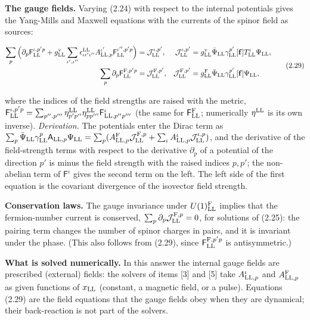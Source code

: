\documentclass[
  10pt,
]{article}
\begin{document}
\textbf{The gauge fields.} Varying (2.24) with respect to the internal
potentials gives the Yang-Mills and Maxwell equations with the currents
of the spinor field as sources:

\[\begin{aligned}
\sum_p\Big(\partial_p\mathsf F^{\iota,p'p}_{\rm LL}+g^{\rm v}_{\rm LL}\sum_{\iota',\iota''}\epsilon^{\rm LL}_{\iota\iota'\iota''}A^{\iota'}_{{\rm LL},p}\mathsf F^{\iota'',p'p}_{\rm LL}\Big)&=\mathcal J^{\iota,p'}_{\rm LL},&\mathcal J^{\iota,p'}_{\rm LL}&=g^{\rm v}_{\rm LL}\bar\Psi_{\rm LL}\gamma^{p'}_{\rm LL}[\mathbf f]T^\iota_{\rm LL}\Psi_{\rm LL},\\
\sum_p\partial_p\mathsf F^{{\rm F},p'p}_{\rm LL}&=\mathcal J^{{\rm F},p'}_{\rm LL},&\mathcal J^{{\rm F},p'}_{\rm LL}&=g^{\rm F}_{\rm LL}\bar\Psi_{\rm LL}\gamma^{p'}_{\rm LL}[\mathbf f]\Psi_{\rm LL},
\end{aligned}\tag{2.29}\]

where the indices of the field strengths are raised with the metric,
\(\mathsf F^{\iota,p'p}_{\rm LL}=\sum_{p'',p'''}\eta^{\rm LL}_{p'p''}\eta^{\rm LL}_{pp'''}\mathsf F^\iota_{{\rm LL},p''p'''}\)
(the same for \(\mathsf F^{\rm F}_{{\rm LL}}\); numerically
\(\eta^{\rm LL}\) is its own inverse). \emph{Derivation.} The potentials
enter the Dirac term as
\(\sum_p\bar\Psi_{\rm LL}\gamma^p_{\rm LL}\mathsf A_{{\rm LL},p}\Psi_{\rm LL}=\sum_p(A^{\rm F}_{{\rm LL},p}\mathcal J^{{\rm F},p}_{\rm LL}+\sum_\iota A^\iota_{{\rm LL},p}\mathcal J^{\iota,p}_{\rm LL})\),
and the derivative of the field-strength terms with respect to the
derivative \(\partial_p\) of a potential of the direction \(p'\) is
minus the field strength with the raised indices \(p,p'\); the
non-abelian term of \(\mathsf F^\iota\) gives the second term on the
left. The left side of the first equation is the covariant divergence of
the isovector field strength.

\textbf{Conservation laws.} The gauge invariance under
\(U(1)^{\rm F}_{\rm LL}\) implies that the fermion-number current is
conserved, \(\sum_p\partial_p\mathcal J^{{\rm F},p}_{\rm LL}=0\), for
solutions of (2.25): the pairing term changes the number of spinor
charges in pairs, and it is invariant under the phase. (This also
follows from (2.29), since \(\mathsf F^{{\rm F},p'p}_{\rm LL}\) is
antisymmetric.)

\textbf{What is solved numerically.} In this answer the internal gauge
fields are prescribed (external) fields: the solvers of items {[}3{]}
and {[}5{]} take \(A^\iota_{{\rm LL},p}\) and \(A^{\rm F}_{{\rm LL},p}\)
as given functions of \(x_{\rm LL}\) (constant, a magnetic field, or a
pulse). Equations (2.29) are the field equations that the gauge fields
obey when they are dynamical; their back-reaction is not part of the
solvers.
\end{document}
